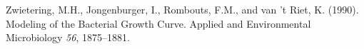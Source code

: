 \documentclass[ms, hidelinks]{uncgdissertationexp}
\theoremstyle{plain}
\theoremstyle{definition}
\theoremstyle{remark}
\begin{document}
\leavevmode\hypertarget{ref-zwieteringModelingBacterialGrowth1990}{}%
Zwietering, M.H., Jongenburger, I., Rombouts, F.M., and van 't Riet, K. (1990). Modeling of the Bacterial Growth Curve. Applied and Environmental Microbiology \emph{56}, 1875--1881.




\appendix
\end{document}
